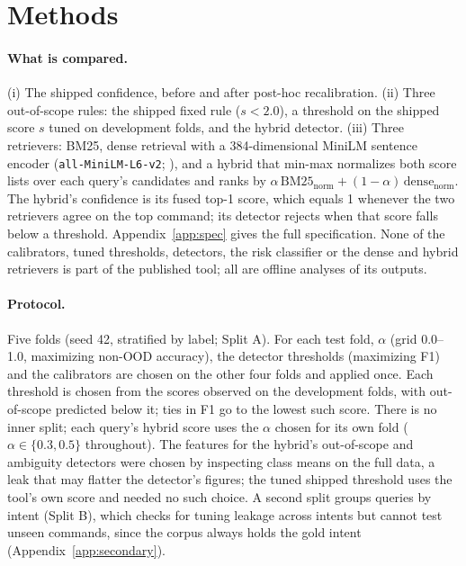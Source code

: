 \section{Methods}
\label{sec:methods}

\paragraph{What is compared.} (i) The shipped confidence, before and after post-hoc recalibration. (ii) Three
out-of-scope rules: the shipped fixed rule ($s<2.0$), a threshold on the shipped score $s$ tuned on development
folds, and the hybrid detector. (iii) Three retrievers: BM25, dense retrieval with a 384-dimensional MiniLM
sentence encoder (\texttt{all-MiniLM-L6-v2}; \citealp{wang2020minilm,reimers-gurevych-2019-sentence}), and a hybrid
that min-max normalizes both score lists over each query's candidates and ranks by
$\alpha\,\mathrm{BM25}_{\mathrm{norm}}+(1-\alpha)\,\mathrm{dense}_{\mathrm{norm}}$. The hybrid's confidence is
its fused top-1 score, which equals 1 whenever the two retrievers agree on the top command; its detector rejects
when that score falls below a threshold. Appendix~\ref{app:spec} gives the full specification. None of the
calibrators, tuned thresholds, detectors, the risk classifier or the dense and hybrid retrievers is part of the
published tool; all are offline analyses of its outputs.

\paragraph{Protocol.} Five folds (seed 42, stratified by label; Split A). For each test fold, $\alpha$ (grid
0.0--1.0, maximizing non-OOD accuracy), the detector thresholds (maximizing F1) and the calibrators are chosen
on the other four folds and applied once. Each threshold is chosen from the scores observed on the development
folds, with out-of-scope predicted below it; ties in F1 go to the lowest such score. There is no inner split;
each query's hybrid score uses the $\alpha$ chosen for its own fold ($\alpha\in\{0.3,0.5\}$ throughout). The
features for the hybrid's out-of-scope and ambiguity detectors were chosen by inspecting class means on the full
data, a leak that may flatter the detector's figures; the tuned shipped threshold uses the tool's own score
and needed no such choice. A second split groups queries by intent (Split B),
which checks for tuning leakage across intents but cannot test unseen commands, since the corpus always holds the
gold intent (Appendix~\ref{app:secondary}).

